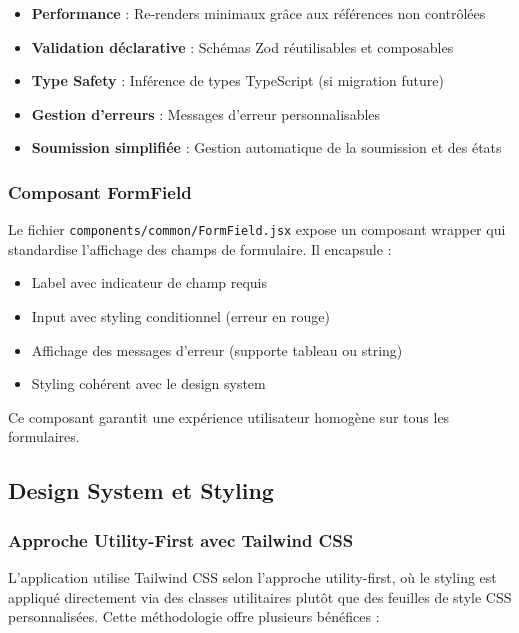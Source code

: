\begin{itemize}
    \item \textbf{Performance} : Re-renders minimaux grâce aux références non contrôlées
    \item \textbf{Validation déclarative} : Schémas Zod réutilisables et composables
    \item \textbf{Type Safety} : Inférence de types TypeScript (si migration future)
    \item \textbf{Gestion d'erreurs} : Messages d'erreur personnalisables
    \item \textbf{Soumission simplifiée} : Gestion automatique de la soumission et des états
\end{itemize}

\subsubsection{Composant FormField}

Le fichier \texttt{components/common/FormField.jsx} expose un composant wrapper qui standardise l'affichage des champs de formulaire. Il encapsule :

\begin{itemize}
    \item Label avec indicateur de champ requis
    \item Input avec styling conditionnel (erreur en rouge)
    \item Affichage des messages d'erreur (supporte tableau ou string)
    \item Styling cohérent avec le design system
\end{itemize}

Ce composant garantit une expérience utilisateur homogène sur tous les formulaires.

\subsection{Design System et Styling}

\subsubsection{Approche Utility-First avec Tailwind CSS}

L'application utilise Tailwind CSS selon l'approche utility-first, où le styling est appliqué directement via des classes utilitaires plutôt que des feuilles de style CSS personnalisées. Cette méthodologie offre plusieurs bénéfices :

